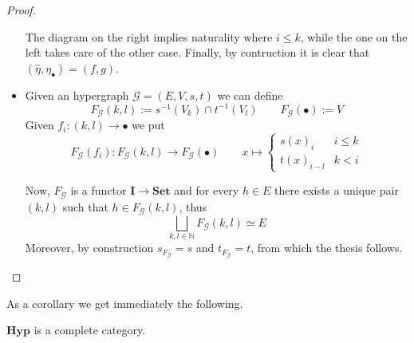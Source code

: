 \documentclass[runningheads,envcountsect]{lmcs}
\newcommand{\hyp}{\catname{Hyp}}
\newcommand{\catname}[1]{\mathbf{#1}}
\theoremstyle{plain}
\theoremstyle{definition}
\begin{document}
\begin{proof}
\begin{itemize}
\begin{center}
\end{center}
	The diagram on the right implies naturality where $i\leq k$, while the one on the left takes care of the other case. Finally, by contruction it is clear that $(\hat{\eta}, \eta_{\bullet})=(f,g)$. 
		\item Given an hypergraph $\mathcal{G}=(E, V, s, t)$ we can define 
		\[F_{\mathcal{G}}(k,l):=s^{-1}(V_k)\cap t^{-1}(V_l) \qquad F_{\mathcal{G}}(\bullet):=V\]
		Given $f_i:(k,l)\to \bullet$ we put
	\[F_{\mathcal{G}}(f_i):F_{\mathcal{G}}(k,l)\to F_{\mathcal{G}}(\bullet) \qquad x\mapsto \begin{cases}
	s(x)_{i} & i\leq k\\
	t(x)_{i-l} &k <i
	\end{cases}  \]
	
Now, $F_{\mathcal{G}}$ is a functor $\catname{I}\to \catname{Set}$ and for every $h\in E$ there exists a unique pair $(k,l)$ such that $h\in F_{\mathcal{G}}(k,l) $, thus
\[\bigsqcup_{k,l\in \mathbb{N}}F_{\mathcal{G}}(k,l)\simeq E\]
Moreover, by construction $s_{F_{\mathcal{G}}}=s$ and $t_{F_{\mathcal{G}}}=t$, from which the thesis follows. \qedhere
	\end{itemize}
\end{proof}
As a corollary we get immediately the following.
\begin{cor}
	$\hyp$ is a complete category.
\end{cor}
\iffalse 
\end{document}
